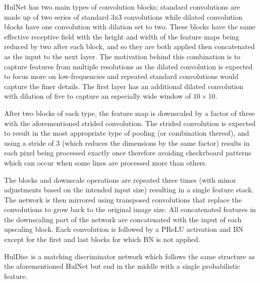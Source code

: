 HulNet has two main types of convolution blocks; standard convolutions are made up of two series of standard 3x3 convolutions while dilated convolution blocks have one convolution with dilation set to two. These blocks have the same effective receptive field with the height and width of the feature maps being reduced by two after each block, and so they are both applied then concatenated as the input to the next layer. The motivation behind this combination is to capture features from multiple resolutions as the dilated convolution is expected to focus more on low-frequencies and repeated standard convolutions would capture the finer details. The first layer has an additional dilated convolution with dilation of five to capture an especially wide window of $10\times 10$.

After two blocks of each type, the feature map is downscaled by a factor of three with the aforementioned strided convolution. The strided convolution is expected to result in the most appropriate type of pooling (or combination thereof), and using a stride of 3 (which reduces the dimensions by the same factor) results in each pixel being processed exactly once therefore avoiding checkrboard patterns which can occur when some lines are processed more than others.

The blocks and downscale operations are repeated three times (with minor adjustments based on the intended input size) resulting in a single feature stack. The network is then mirrored using transposed convolutions that replace the convolutions to grow back to the original image size. All concatenated features in the downscaling part of the network are concatenated with the input of each upscaling block.
Each convolution is followed by a \ac{PReLU} activation and \ac{BN} except for the first and last blocks for which \ac{BN} is not applied.

HulDisc is a matching discriminator network which follows the same structure as the aforementioned HulNet but end in the middle with a single probabilistic feature. %
